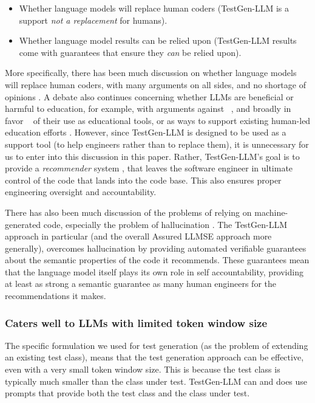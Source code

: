 \documentclass[sigconf,screen]{acmart}
\begin{document}
\begin{itemize}
    \item Whether language models will replace human coders (TestGen-LLM is a support {\em not a replacement} for humans).
    \item Whether language model results can be relied upon (TestGen-LLM results come with guarantees that ensure they {\em can} be relied upon).
\end{itemize}

More specifically, there has been much discussion on whether language models will replace human coders, with many arguments on all sides, and no shortage of opinions \cite{mhetal:LLM-survey}.
A debate also continues concerning whether LLMs are beneficial or harmful to education, for example, with arguments against ~\cite{meckler:alert}, and broadly in favor ~\cite{heaven:chat} of their use as educational tools, or as ways to support existing human-led education efforts \cite{sarsa_automatic_2022,macneil_experiences_2023,noever_chatbots_nodate}.
However, since TestGen-LLM is designed to be used as a support tool (to help engineers rather than to replace them), it is unnecessary for us to enter into this discussion in this paper.
Rather, TestGen-LLM's goal is to provide a {\em recommender} system \cite{adomavicius:recommender}, that leaves the software engineer in ultimate control of the code that lands into the code base. 
This also ensures proper engineering oversight and accountability.

There has also been much discussion of the problems of relying on machine-generated code, especially the problem of hallucination \cite{ma:scope,mhetal:LLM-survey}.
The TestGen-LLM approach in particular (and the overall Assured LLMSE approach more generally),  
overcomes hallucination by providing automated verifiable guarantees about the semantic properties of the code it recommends. 
These guarantees mean that the language model itself plays its own role in self accountability, providing at least as strong a semantic guarantee as many human engineers for the recommendations it makes.



\subsubsection{Caters well to LLMs with limited token window size}
The specific formulation we used for test generation (as the problem of extending an existing test class), means that the test generation approach can be effective, even with a very small token window size. 
This is because the test class is typically much smaller than the class under test. 
TestGen-LLM can and does use prompts that provide both the test class and the class under test. 
\end{document}
